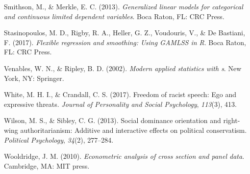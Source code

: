 \documentclass[english,man]{apa6}
\newcounter{author}
\theoremstyle{definition}
\theoremstyle{definition}
\theoremstyle{remark}
\begin{document}
\hypertarget{ref-smithson2013generalized}{}
Smithson, M., \& Merkle, E. C. (2013). \emph{Generalized linear models
for categorical and continuous limited dependent variables}. Boca Raton,
FL: CRC Press.

\hypertarget{ref-stasinopoulos2017flexible}{}
Stasinopoulos, M. D., Rigby, R. A., Heller, G. Z., Voudouris, V., \& De
Bastiani, F. (2017). \emph{Flexible regression and smoothing: Using
GAMLSS in R}. Boca Raton, FL: CRC Press.

\hypertarget{ref-venables2002modern}{}
Venables, W. N., \& Ripley, B. D. (2002). \emph{Modern applied
statistics with s}. New York, NY: Springer.

\hypertarget{ref-white2017freedom}{}
White, M. H. I., \& Crandall, C. S. (2017). Freedom of racist speech:
Ego and expressive threats. \emph{Journal of Personality and Social
Psychology}, \emph{113}(3), 413.

\hypertarget{ref-wilson2013social}{}
Wilson, M. S., \& Sibley, C. G. (2013). Social dominance orientation and
right-wing authoritarianism: Additive and interactive effects on
political conservatism. \emph{Political Psychology}, \emph{34}(2),
277--284.

\hypertarget{ref-wooldridge2010econometric}{}
Wooldridge, J. M. (2010). \emph{Econometric analysis of cross section
and panel data}. Cambridge, MA: MIT press.
\end{document}
